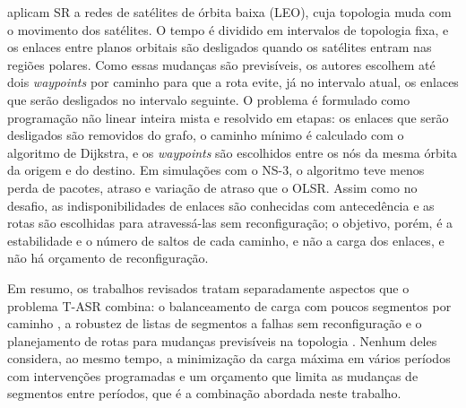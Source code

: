 \citet{chen2022waypoint} aplicam SR a redes de satélites de órbita baixa (LEO), cuja topologia muda com o movimento dos satélites. O tempo é dividido em intervalos de topologia fixa, e os enlaces entre planos orbitais são desligados quando os satélites entram nas regiões polares. Como essas mudanças são previsíveis, os autores escolhem até dois \textit{waypoints} por caminho para que a rota evite, já no intervalo atual, os enlaces que serão desligados no intervalo seguinte. O problema é formulado como programação não linear inteira mista e resolvido em etapas: os enlaces que serão desligados são removidos do grafo, o caminho mínimo é calculado com o algoritmo de Dijkstra, e os \textit{waypoints} são escolhidos entre os nós da mesma órbita da origem e do destino. Em simulações com o NS-3, o algoritmo teve menos perda de pacotes, atraso e variação de atraso que o OLSR. Assim como no desafio, as indisponibilidades de enlaces são conhecidas com antecedência e as rotas são escolhidas para atravessá-las sem reconfiguração; o objetivo, porém, é a estabilidade e o número de saltos de cada caminho, e não a carga dos enlaces, e não há orçamento de reconfiguração.

Em resumo, os trabalhos revisados tratam separadamente aspectos que o problema T-ASR combina: o balanceamento de carga com poucos segmentos por caminho \citep{yang2023intelligent}, a robustez de listas de segmentos a falhas sem reconfiguração \citep{aubry2018robustly} e o planejamento de rotas para mudanças previsíveis na topologia \citep{chen2022waypoint}. Nenhum deles considera, ao mesmo tempo, a minimização da carga máxima em vários períodos com intervenções programadas e um orçamento que limita as mudanças de segmentos entre períodos, que é a combinação abordada neste trabalho.
